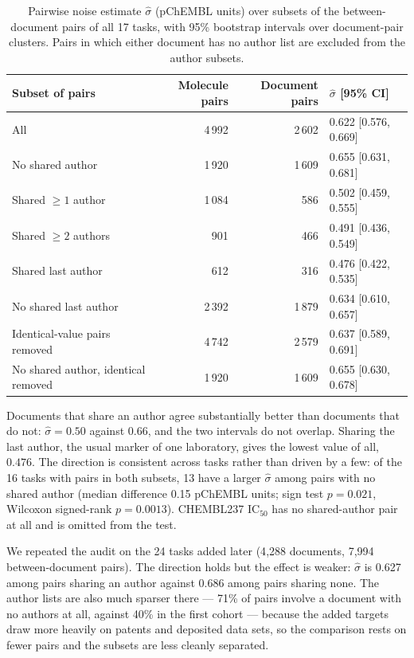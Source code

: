 \begin{table}[t]
\centering
\caption{Pairwise noise estimate $\hat\sigma$ (pChEMBL units) over subsets of the between-document pairs of all 17 tasks, with 95\% bootstrap intervals over document-pair clusters. Pairs in which either document has no author list are excluded from the author subsets.}
\label{tab:provenance}
\begin{tabular}{lrrl}
\toprule
Subset of pairs & Molecule pairs & Document pairs & $\hat\sigma$ [95\% CI] \\
\midrule
All & 4\,992 & 2\,602 & 0.622 [0.576, 0.669] \\
No shared author & 1\,920 & 1\,609 & 0.655 [0.631, 0.681] \\
Shared $\ge1$ author & 1\,084 & 586 & 0.502 [0.459, 0.555] \\
Shared $\ge2$ authors & 901 & 466 & 0.491 [0.436, 0.549] \\
Shared last author & 612 & 316 & 0.476 [0.422, 0.535] \\
No shared last author & 2\,392 & 1\,879 & 0.634 [0.610, 0.657] \\
Identical-value pairs removed & 4\,742 & 2\,579 & 0.637 [0.589, 0.691] \\
No shared author, identical removed & 1\,920 & 1\,609 & 0.655 [0.630, 0.678] \\
\bottomrule
\end{tabular}
\end{table}

Documents that share an author agree substantially better than documents that do not: $\hat\sigma=0.50$ against $0.66$, and the two intervals do not overlap. Sharing the last author, the usual marker of one laboratory, gives the lowest value of all, $0.476$. The direction is consistent across tasks rather than driven by a few: of the 16 tasks with pairs in both subsets, 13 have a larger $\hat\sigma$ among pairs with no shared author (median difference 0.15 pChEMBL units; sign test $p=0.021$, Wilcoxon signed-rank $p=0.0013$). CHEMBL237 $\mathrm{IC}_{50}$ has no shared-author pair at all and is omitted from the test.

We repeated the audit on the 24 tasks added later (4{,}288 documents, 7{,}994 between-document pairs). The direction holds but the effect is weaker: $\hat\sigma$ is 0.627 among pairs sharing an author against 0.686 among pairs sharing none. The author lists are also much sparser there --- 71\% of pairs involve a document with no authors at all, against 40\% in the first cohort --- because the added targets draw more heavily on patents and deposited data sets, so the comparison rests on fewer pairs and the subsets are less cleanly separated.

